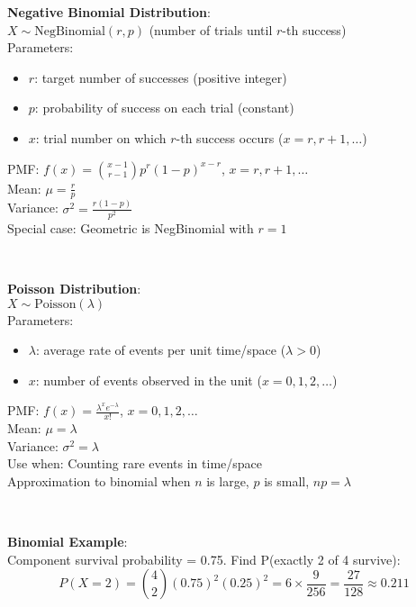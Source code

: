 \documentclass{article}
\newenvironment{cheatformula}[1][Title]{
    \begin{minipage}{\linewidth}
    \textbf{#1}:\\
}{
    \end{minipage}\\[2ex]
}
\begin{document}
\begin{multicols*}{2}
\begin{cheatformula}[Negative Binomial Distribution]
    $X \sim \text{NegBinomial}(r,p)$ (number of trials until $r$-th success)\\
    Parameters:
    \begin{itemize}
        \item $r$: target number of successes (positive integer)
        \item $p$: probability of success on each trial (constant)
        \item $x$: trial number on which $r$-th success occurs ($x = r,r+1,\ldots$)
    \end{itemize}
    PMF: $f(x) = \binom{x-1}{r-1}p^r(1-p)^{x-r}$, $x = r,r+1,\ldots$\\
    Mean: $\mu = \frac{r}{p}$\\
    Variance: $\sigma^2 = \frac{r(1-p)}{p^2}$\\
    
    Special case: Geometric is NegBinomial with $r=1$
\end{cheatformula}

\begin{cheatformula}[Poisson Distribution]
    $X \sim \text{Poisson}(\lambda)$\\
    Parameters:
    \begin{itemize}
        \item $\lambda$: average rate of events per unit time/space ($\lambda > 0$)
        \item $x$: number of events observed in the unit ($x = 0,1,2,\ldots$)
    \end{itemize}
    PMF: $f(x) = \frac{\lambda^x e^{-\lambda}}{x!}$, $x = 0,1,2,\ldots$\\
    Mean: $\mu = \lambda$\\
    Variance: $\sigma^2 = \lambda$\\
    
    Use when: Counting rare events in time/space\\
    Approximation to binomial when $n$ is large, $p$ is small, $np = \lambda$
\end{cheatformula}

\begin{cheatformula}[Binomial Example]
    Component survival probability = 0.75. Find P(exactly 2 of 4 survive):
    $$P(X = 2) = \binom{4}{2}(0.75)^2(0.25)^2 = 6 \times \frac{9}{256} = \frac{27}{128} \approx 0.211$$
\end{cheatformula}


\end{multicols*}
\end{document}
